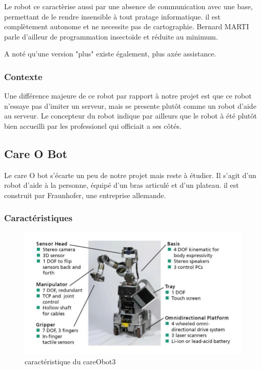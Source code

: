 Le robot ce caractèrise aussi par une absence de communication avec
une base, permettant de le rendre insensible à tout pratage
informatique. il est complètement autonome et ne necessite pas de
cartographie. Bernard MARTI parle d'ailleur de programmation
insectoïde et réduite au minimum.

A noté qu'une version "plus" existe également, plus axée assistance.

\subsubsection*{Contexte}

Une différence majeure de ce robot par rapport à notre projet est que ce robot n'essaye pas d'imiter un serveur, mais se presente plutôt comme un robot d'aide au serveur. Le concepteur du robot indique par ailleurs que le robot à été plutôt bien accueilli par les professionel qui officiait a ses côtés. 

\subsection*{Care O Bot}

Le care O bot s'écarte un peu de notre projet mais reste à étudier. Il
s'agit d'un robot d'aide à la personne, équipé d'un bras articulé et
d'un plateau. il est construit par Fraunhofer, une entreprise
allemande.

\subsubsection*{Caractéristiques}

\begin{figure}[h]
\begin{center}
\includegraphics[scale=0.55]{Images/cob3-hardware.jpg}
\caption{caractéristique du careObot3}
\label{caractéristique du careObot3}
\end{center}
\end{figure}

